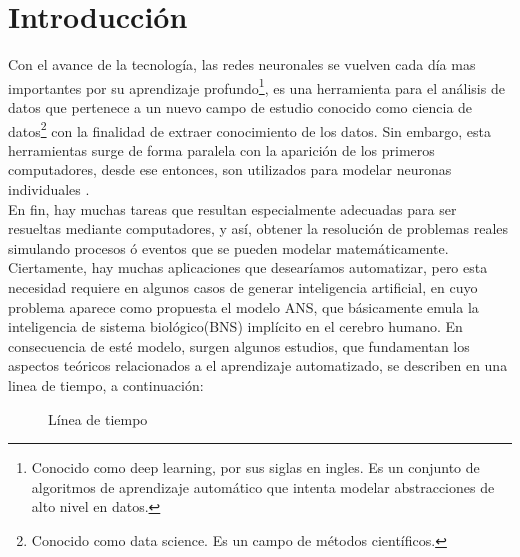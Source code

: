 \documentclass[11pt,titlepage]{report}
\begin{document}
\tableofcontents

\chapter*{Introducción}
Con el avance de la tecnología, las redes neuronales se vuelven cada día mas importantes por su aprendizaje profundo\footnote{Conocido como deep learning, por sus siglas en ingles. Es un conjunto de algoritmos de aprendizaje automático que intenta modelar abstracciones de alto nivel en datos.\cite{Int08}}, es una herramienta para el análisis de datos que pertenece a un nuevo campo de estudio conocido como ciencia de datos\footnote{Conocido como data science. Es un campo de métodos científicos.} con la finalidad de extraer conocimiento de los datos. Sin embargo, esta herramientas surge de forma paralela con la aparición de los primeros computadores, desde ese entonces, son utilizados para modelar neuronas individuales \cite{Lib03}.\\

 En fin, hay muchas tareas que resultan especialmente adecuadas para ser resueltas mediante computadores, y así, obtener la resolución de problemas reales simulando procesos ó eventos que se pueden modelar matemáticamente. Ciertamente, hay muchas aplicaciones que desearíamos automatizar, pero esta necesidad requiere en algunos casos de generar inteligencia artificial, en cuyo problema aparece como propuesta el modelo ANS, que básicamente emula la inteligencia de sistema biológico(BNS) implícito en el cerebro humano. En consecuencia de esté modelo, surgen algunos estudios, que fundamentan los aspectos teóricos relacionados a el aprendizaje automatizado, se describen en una linea de tiempo, a continuación:  

\begin{figure}[h]
	\caption{Línea de tiempo}
	\centering
	\label{fig:time_line}
\end{figure}
\end{document}
